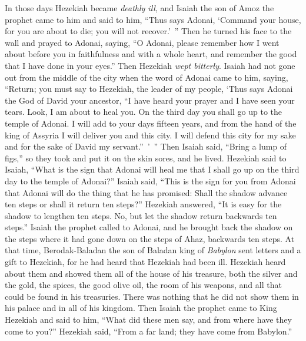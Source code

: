 \begin{biblechapter} %
 In those days Hezekiah became \textit{deathly ill}, and Isaiah the son of Amoz the prophet came to him and said to him, “Thus says Adonai, ‘Command your house, for you are about to die; you will not recover.’ ”
\verse Then he turned his face to the wall and prayed to Adonai, saying,
\verse “O Adonai, please remember how I went about before you in faithfulness and with a whole heart, and remember the good that I have done in your eyes.” Then Hezekiah \textit{wept bitterly}.
\verse Isaiah had not gone out from the middle of the city when the word of Adonai came to him, saying,
\verse “Return; you must say to Hezekiah, the leader of my people, ‘Thus says Adonai the God of David your ancestor, “I have heard your prayer and I have seen your tears. Look, I am about to heal you. On the third day you shall go up to the temple of Adonai.
\verse I will add to your days fifteen years, and from the hand of the king of Assyria I will deliver you and this city. I will defend this city for my sake and for the sake of David my servant.” ’ ”
\verse Then Isaiah said, “Bring a lump of figs,” so they took and put it on the skin sores, and he lived.
\verse Hezekiah said to Isaiah, “What is the sign that Adonai will heal me that I shall go up on the third day to the temple of Adonai?”
\verse Isaiah said, “This is the sign for you from Adonai that Adonai will do the thing that he has promised: Shall the shadow advance ten steps or shall it return ten steps?”
\verse Hezekiah answered, “It is easy for the shadow to lengthen ten steps. No, but let the shadow return backwards ten steps.”
\verse Isaiah the prophet called to Adonai, and he brought back the shadow on the steps where it had gone down on the steps of Ahaz, backwards ten steps.
 At that time, Berodak-Baladan the son of Baladan king of \textit{Babylon} sent letters and a gift to Hezekiah, for he had heard that Hezekiah had been ill.
\verse Hezekiah heard about them and showed them all of the house of his treasure, both the silver and the gold, the spices, the good olive oil, the room of his weapons, and all that could be found in his treasuries. There was nothing that he did not show them in his palace and in all of his kingdom.
\verse Then Isaiah the prophet came to King Hezekiah and said to him, “What did these men say, and from where have they come to you?” Hezekiah said, “From a far land; they have come from Babylon.”

\end{biblechapter}

